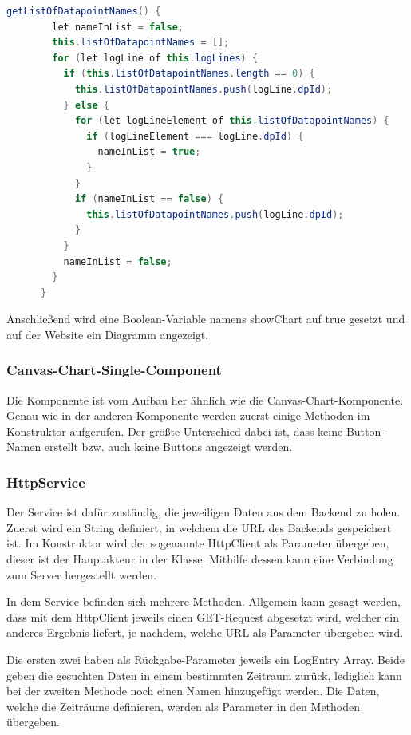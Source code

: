 \begin{lstlisting}[language=java,caption=getListOfDatapointNames()-Methode,label=lst:impl:getListOfDatapointsMethod]
    getListOfDatapointNames() {
        let nameInList = false;
        this.listOfDatapointNames = [];
        for (let logLine of this.logLines) {
          if (this.listOfDatapointNames.length == 0) {
            this.listOfDatapointNames.push(logLine.dpId);
          } else {
            for (let logLineElement of this.listOfDatapointNames) {
              if (logLineElement === logLine.dpId) {
                nameInList = true;
              }
            }
            if (nameInList == false) {
              this.listOfDatapointNames.push(logLine.dpId);
            }
          }
          nameInList = false;
        }
      }
\end{lstlisting}
 
Anschließend wird eine Boolean-Variable namens showChart auf true gesetzt und auf der Website ein Diagramm angezeigt.
 
\subsubsection{Canvas-Chart-Single-Component}
Die Komponente ist vom Aufbau her ähnlich wie die Canvas-Chart-Komponente. Genau wie in der anderen Komponente werden zuerst einige Methoden im Konstruktor aufgerufen. Der größte Unterschied dabei ist, dass keine Button-Namen erstellt bzw. auch keine Buttons angezeigt werden.
 
\subsubsection{HttpService}
Der Service ist dafür zuständig, die jeweiligen Daten aus dem Backend zu holen. Zuerst wird ein String definiert, in welchem die URL des Backends gespeichert ist. Im Konstruktor wird der sogenannte HttpClient als Parameter übergeben, dieser ist der Hauptakteur in der Klasse. Mithilfe dessen kann eine Verbindung zum Server hergestellt werden.
 
In dem Service befinden sich mehrere Methoden. Allgemein kann gesagt werden, dass mit dem HttpClient jeweils einen GET-Request abgesetzt wird, welcher ein anderes Ergebnis liefert, je nachdem, welche URL als Parameter übergeben wird.
 
Die ersten zwei haben als Rückgabe-Parameter jeweils ein LogEntry Array. Beide geben die gesuchten Daten in einem bestimmten Zeitraum zurück, lediglich kann bei der zweiten Methode noch einen Namen hinzugefügt werden. Die Daten, welche die Zeiträume definieren, werden als Parameter in den Methoden übergeben.

